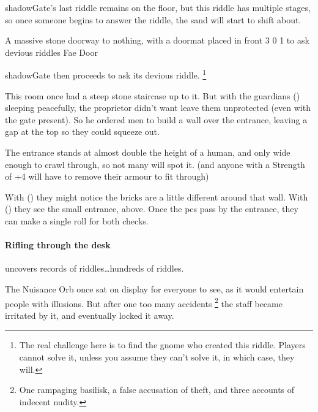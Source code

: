 \begin{multicols}{2}
\Gls{shadowGate}'s last riddle remains on the floor, but this riddle has multiple stages, so once someone begins to answer the riddle, the sand will start to shift about.

  {A massive stone doorway to nothing, with a doormat placed in front}%
  {3}%
  {0}%
  {1}%
  {to ask devious riddles}%
  {Fae Door}%
  {
    \setcounter{Fire}{2}
    \setcounter{Earth}{3}
    \setcounter{Water}{1}
    \setcounter{Academics}{2}
    \setcounter{Caving}{1}
    \setcounter{Xenomology}{1}
  }%

\showStdSpells[
  \setcounter{diceNo}{0}
]

\Gls{shadowGate} then proceeds to ask its devious riddle.%
\footnote{The real challenge here is to find the gnome who created this riddle. Players cannot solve it, unless you assume they can't solve it, in which case, they will.}

\hardestRiddleEver


\begin{exampletext}
  This room once had a steep stone staircase up to it.
  But with the guardians () sleeping peacefully, the proprietor didn't want leave them unprotected (even with the gate present).
  So he ordered men to build a wall over the entrance, leaving a gap at the top so they could squeeze out.
\end{exampletext}

The entrance stands at almost double the height of a human, and only wide enough to crawl through, so not many will spot it.
(and anyone with a Strength of +4 will have to remove their armour to fit through)

With  (\tn[14]) they might notice the bricks are a little different around that wall.
With  (\tn[12]) they see the small entrance, above.
Once the \glspl{pc} pass by the entrance, they can make a single roll for both checks.

\paragraph{Rifling through the desk}
uncovers records of riddles\ldots hundreds of riddles.


\begin{exampletext}
  The Nuisance Orb once sat on display for everyone to see, as it would entertain people with illusions.
  But after one too many accidents%
  \footnote{One rampaging \gls{basilisk}, a false accusation of theft, and three accounts of indecent nudity.}
  the staff became irritated by it, and eventually locked it away.
\end{exampletext}


\end{multicols}
